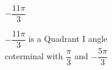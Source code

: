 {$-\dfrac{11\pi}{3}$}
{$-\dfrac{11\pi}{3}$  is a Quadrant I angle\\
coterminal with $\dfrac{\pi}{3}$ and $-\dfrac{5\pi}{3}$ 

\begin{center}
\end{center}}
